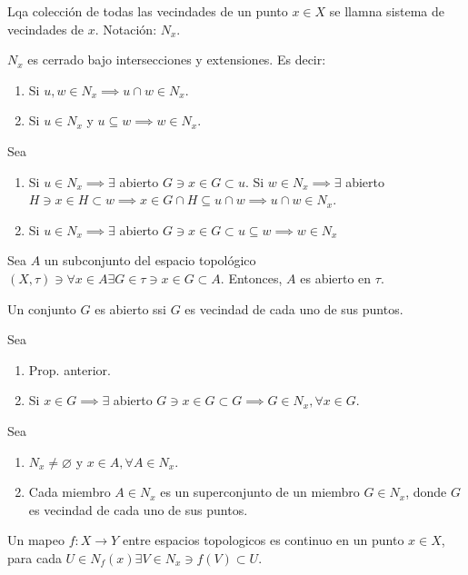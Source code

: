 \begin{definicion}
    Lqa colección de todas las vecindades de un punto $x\in X$ se llamna sistema de vecindades de $x$. Notación: $N_x$. 
\end{definicion}
\begin{prop}
    $N_x$ es cerrado bajo intersecciones y extensiones. Es decir: 
    \begin{enumerate}
        \item Si $u,w\in N_x\implies u\cap w\in N_x$.
        \item Si $u\in N_x$ y $u\subseteq w \implies w\in N_x$. 
    \end{enumerate}
        \begin{dem}
            Sea
            \begin{enumerate}
                \item Si $u\in N_x\implies \exists$ abierto $G\ni x\in G\subset u$. Si $w\in N_x\implies \exists$ abierto $H\ni x\in H\subset w\implies x\in G\cap H\subseteq u\cap w\implies u\cap w\in N_x$.
                \item Si $u\in N_x\implies \exists $ abierto $G\ni x\in G\subset u\subseteq w\implies w\in N_x$
            \end{enumerate}
            
        \end{dem}
\end{prop}
\begin{prop}
    Sea $A$ un subconjunto del espacio topológico $(X,\tau)\ni \forall x\in A\exists G\in\tau\ni x\in G\subset A$. Entonces, $A$ es abierto en $\tau$. 
\end{prop}
\begin{prop}
    Un conjunto $G$ es abierto ssi $G$ es vecindad de cada uno de sus puntos. 
    \begin{dem}
        Sea 
        \begin{enumerate}
            \item Prop. anterior. 
            \item Si $x\in G\implies \exists $ abierto $G\ni x\in G\subset G\implies G\in N_x,\forall x\in G$. 
        \end{enumerate}
    \end{dem}
\end{prop}

\begin{prop}
    Sea 
    \begin{enumerate}
        \item $N_x\neq \varnothing$ y $x\in A,\forall A\in N_x$. 
        \item Cada miembro $A\in N_x$ es un superconjunto de un miembro $G\in N_x$, donde $G$ es vecindad de cada uno de sus puntos. 
    \end{enumerate}
\end{prop}
\begin{definicion}
    Un mapeo $f:X\to Y$ entre espacios topologicos es continuo en un punto $x\in X$, para cada $U\in N_f(x)\exists V\in N_x\ni f(V)\subset U$. 
\end{definicion}

